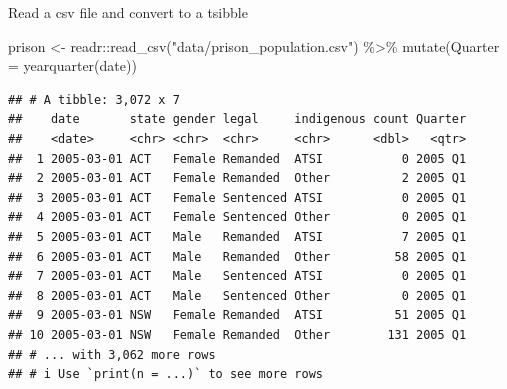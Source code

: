 \documentclass[14pt,ignorenonframetext,aspectratio=169]{beamer}
\newenvironment{Shaded}{\begin{snugshade}}{\end{snugshade}}
\newcommand{\AttributeTok}[1]{\textcolor[rgb]{0.77,0.63,0.00}{#1}}
\newcommand{\FunctionTok}[1]{\textcolor[rgb]{0.00,0.00,0.00}{#1}}
\newcommand{\NormalTok}[1]{#1}
\newcommand{\OtherTok}[1]{\textcolor[rgb]{0.56,0.35,0.01}{#1}}
\newcommand{\SpecialCharTok}[1]{\textcolor[rgb]{0.00,0.00,0.00}{#1}}
\newcommand{\StringTok}[1]{\textcolor[rgb]{0.31,0.60,0.02}{#1}}
\renewenvironment{Shaded}{\color{black}\begin{snugshade}\color{black}}{\end{snugshade}}
\renewenvironment{Shaded}{\color{black}\fontsize{10}{10}\sf\begin{snugshade}\color{black}}{\end{snugshade}}
\begin{document}
\begin{frame}[fragile]{Read a csv file and convert to a tsibble}
\protect\hypertarget{read-a-csv-file-and-convert-to-a-tsibble-1}{}
\fontsize{10}{11}\sf

\begin{Shaded}
\begin{Highlighting}[]
\NormalTok{prison }\OtherTok{\textless{}{-}}\NormalTok{ readr}\SpecialCharTok{::}\FunctionTok{read\_csv}\NormalTok{(}\StringTok{"data/prison\_population.csv"}\NormalTok{) }\SpecialCharTok{\%\textgreater{}\%}
  \FunctionTok{mutate}\NormalTok{(}\AttributeTok{Quarter =} \FunctionTok{yearquarter}\NormalTok{(date))}
\end{Highlighting}
\end{Shaded}

\begin{verbatim}
## # A tibble: 3,072 x 7
##    date       state gender legal     indigenous count Quarter
##    <date>     <chr> <chr>  <chr>     <chr>      <dbl>   <qtr>
##  1 2005-03-01 ACT   Female Remanded  ATSI           0 2005 Q1
##  2 2005-03-01 ACT   Female Remanded  Other          2 2005 Q1
##  3 2005-03-01 ACT   Female Sentenced ATSI           0 2005 Q1
##  4 2005-03-01 ACT   Female Sentenced Other          0 2005 Q1
##  5 2005-03-01 ACT   Male   Remanded  ATSI           7 2005 Q1
##  6 2005-03-01 ACT   Male   Remanded  Other         58 2005 Q1
##  7 2005-03-01 ACT   Male   Sentenced ATSI           0 2005 Q1
##  8 2005-03-01 ACT   Male   Sentenced Other          0 2005 Q1
##  9 2005-03-01 NSW   Female Remanded  ATSI          51 2005 Q1
## 10 2005-03-01 NSW   Female Remanded  Other        131 2005 Q1
## # ... with 3,062 more rows
## # i Use `print(n = ...)` to see more rows
\end{verbatim}
\end{frame}
\end{document}
